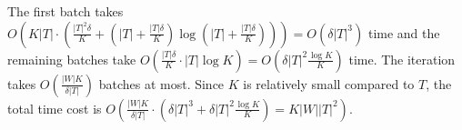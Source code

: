 The first batch takes $O(K|T| \cdot (\frac{|T|^2\delta}{K} + (|T|+\frac{|T|\delta}{K})\log{(|T|+\frac{|T|\delta}{K})})) = O(\delta |T|^3)$ time and
the remaining batches take $O(\frac{|T|\delta}{K} \cdot |T|\log{K}) = O(\delta |T|^2\frac{\log{K}}{K})$ time.
The iteration takes $O(\frac{|W|K}{\delta|T|})$ batches at most.
Since $K$ is relatively small compared to $T$, the total time cost is $O(\frac{|W|K}{\delta|T|} \cdot (\delta |T|^3 + \delta |T|^2\frac{\log{K}}{K}) = K|W||T|^2)$.
